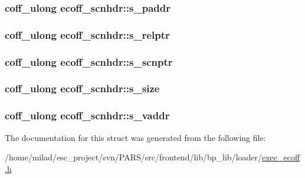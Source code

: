 \label{structecoff__scnhdr_a844726d2153a3eb0075680c12a9828b7}
\hypertarget{structecoff__scnhdr_ae42d0522499118c4e0619d1b7e3a0123}{
\subsubsection[{s\_\-paddr}]{\setlength{\rightskip}{0pt plus 5cm}coff\_\-ulong {\bf ecoff\_\-scnhdr::s\_\-paddr}}}
\label{structecoff__scnhdr_ae42d0522499118c4e0619d1b7e3a0123}
\hypertarget{structecoff__scnhdr_aabb97d798a8099732330465145868664}{
\subsubsection[{s\_\-relptr}]{\setlength{\rightskip}{0pt plus 5cm}coff\_\-ulong {\bf ecoff\_\-scnhdr::s\_\-relptr}}}
\label{structecoff__scnhdr_aabb97d798a8099732330465145868664}
\hypertarget{structecoff__scnhdr_afaf5f4e324e14cf5215871f61d7b65a3}{
\subsubsection[{s\_\-scnptr}]{\setlength{\rightskip}{0pt plus 5cm}coff\_\-ulong {\bf ecoff\_\-scnhdr::s\_\-scnptr}}}
\label{structecoff__scnhdr_afaf5f4e324e14cf5215871f61d7b65a3}
\hypertarget{structecoff__scnhdr_ac7e80fc84ba691a6a19e15fe9b2b7975}{
\subsubsection[{s\_\-size}]{\setlength{\rightskip}{0pt plus 5cm}coff\_\-ulong {\bf ecoff\_\-scnhdr::s\_\-size}}}
\label{structecoff__scnhdr_ac7e80fc84ba691a6a19e15fe9b2b7975}
\hypertarget{structecoff__scnhdr_a175daaf37629fc3f7009df00226bfe8c}{
\subsubsection[{s\_\-vaddr}]{\setlength{\rightskip}{0pt plus 5cm}coff\_\-ulong {\bf ecoff\_\-scnhdr::s\_\-vaddr}}}
\label{structecoff__scnhdr_a175daaf37629fc3f7009df00226bfe8c}


The documentation for this struct was generated from the following file:\begin{DoxyCompactItemize}
\item 
/home/milad/esc\_\-project/svn/PARS/src/frontend/lib/bp\_\-lib/loader/\hyperlink{exec__ecoff_8h}{exec\_\-ecoff.h}\end{DoxyCompactItemize}
